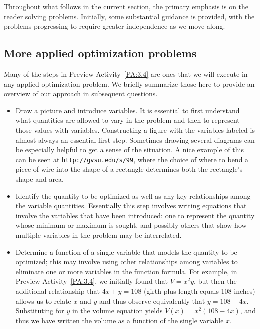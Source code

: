 Throughout what follows in the current section, the primary emphasis is on the reader solving problems.  Initially, some substantial guidance is provided, with the problems progressing to require greater independence as we move along.



\subsection*{More applied optimization problems}

Many of the steps in Preview Activity~\ref{PA:3.4} are ones that we will execute in any applied optimization problem.  We briefly summarize those here to provide an overview of our approach in subsequent questions.

\begin{itemize}
	\item Draw a picture and introduce variables.  It is essential to first understand what quantities are allowed to vary in the problem and then to represent those values with variables.  Constructing a figure with the variables labeled is almost always an essential first step.  Sometimes drawing several diagrams can be especially helpful to get a sense of the situation.  A nice example of this can be seen at \href{http://gvsu.edu/s/99}{\texttt{http://gvsu.edu/s/99}}, where the choice of where to bend a piece of wire into the shape of a rectangle determines both the rectangle's shape and area.
	\item Identify the quantity to be optimized as well as any key relationships among the variable quantities.  Essentially this step involves writing equations that involve the variables that have been introduced: one to represent the quantity whose minimum or maximum is sought, and possibly others that show how multiple variables in the problem may be interrelated.
	\item Determine a function of a single variable that models the quantity to be optimized; this may involve using other relationships among variables to eliminate one or more variables in the function formula.  For example, in Preview Activity~\ref{PA:3.4}, we initially found that $V = x^2 y$, but then the additional relationship that $4x + y = 108$ (girth plus length equals 108 inches) allows us to relate $x$ and $y$ and thus observe equivalently that $y = 108-4x$.  Substituting for $y$ in the volume equation yields $V(x) = x^2(108-4x)$, and thus we have written the volume as a function of the single variable $x$.

\end{itemize}
